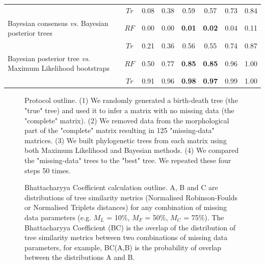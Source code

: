 \documentclass[12pt,letterpaper]{article}
\begin{document}
\begin{landscape}
\begin{table}[ht]
\begin{tabular}{lccccccc}
                                                                       & $Tr$ & 0.08 & 0.38 & 0.59 & 0.57 & 0.73 & 0.84 \\ 
    Bayesian consensus \textit{vs.} Bayesian posterior trees           & $RF$ & 0.00 & 0.00 & \textbf{0.01} & \textbf{0.02} & 0.04 & 0.11 \\ 
                                                                       & $Tr$ & 0.21 & 0.36 & 0.56 & 0.55 & 0.74 & 0.87 \\ 
    Bayesian posterior tree \textit{vs.} Maximum Likelihood bootstraps & $RF$ & 0.50 & 0.77 & \textbf{0.85} & \textbf{0.85} & 0.96 & 1.00 \\ 
                                                                       & $Tr$ & 0.91 & 0.96 & \textbf{0.98} & \textbf{0.97} & 0.99 & 1.00 \\ 
   \hline
\end{tabular}
\label{Tab_Results-Difference_methods}
\end{table}
\end{landscape}



\begin{figure}
\caption{Protocol outline.
(1) We randomly generated a birth-death tree (the "true" tree) and used it to infer a matrix with no missing data (the "complete" matrix).
(2) We removed data from the morphological part of the "complete" matrix resulting in 125 "missing-data" matrices.
(3) We built phylogenetic trees from each matrix using both Maximum Likelihood and Bayesian methods.
(4) We compared the "missing-data" trees to the "best" tree.
We repeated these four steps 50 times.}
\label{Fig_Outline}
\end{figure}

\begin{figure}
\caption{Bhattacharyya Coefficient calculation outline. A, B and C are distributions of tree similarity metrics (Normalised Robinson-Foulds or Normalised Triplets distances) for any combination of missing data parameters (e.g. $M_{L}$ = 10\%, $M_{F}$ = 50\%, $M_{C}$ = 75\%). The Bhattacharyya Coefficient (BC) is the overlap of the distribution of tree similarity metrics between two combinations of missing data parameters, for example, BC(A,B) is the probability of overlap between the distributions A and B.}
\label{Fig_Bhattacharyya_Coefficients1} %
\end{figure}
\end{document}
